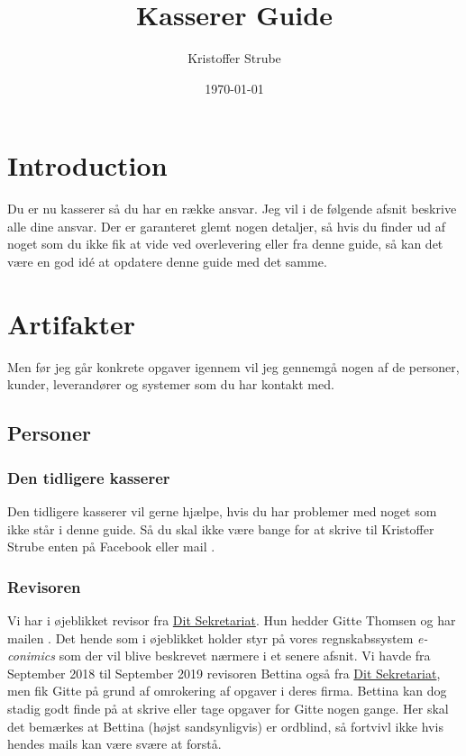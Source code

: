 

\title{Kasserer Guide}                        %
\date{\today}
\author{Kristoffer Strube}                       %



\maketitle

\tableofcontents

\clearpage

\section{Introduction}
Du er nu kasserer så du har en række ansvar. Jeg vil i de følgende afsnit beskrive alle dine ansvar. Der er garanteret glemt nogen detaljer, så hvis du finder ud af noget som du ikke fik at vide ved overlevering eller fra denne guide, så kan det være en god idé at opdatere denne guide med det samme.

\section{Artifakter}
Men før jeg går konkrete opgaver igennem vil jeg gennemgå nogen af de personer, kunder, leverandører og systemer som du har kontakt med.
\subsection{Personer}
\subsubsection{Den tidligere kasserer}
Den tidligere kasserer vil gerne hjælpe, hvis du har problemer med noget som ikke står i denne guide. Så du skal ikke være bange for at skrive til Kristoffer Strube enten på Facebook eller mail .
\subsubsection{Revisoren}
Vi har i øjeblikket revisor fra \href{https://www.sekr.dk/}{Dit Sekretariat}. Hun hedder Gitte Thomsen og har mailen . Det hende som i øjeblikket holder styr på vores regnskabssystem \textit{e-conimics} som der vil blive beskrevet nærmere i et senere afsnit. Vi havde fra September 2018 til September 2019 revisoren Bettina også fra \href{https://www.sekr.dk/}{Dit Sekretariat}, men fik Gitte på grund af omrokering af opgaver i deres firma. Bettina kan dog stadig godt finde på at skrive eller tage opgaver for Gitte nogen gange. Her skal det bemærkes at Bettina (højst sandsynligvis) er ordblind, så fortvivl ikke hvis hendes mails kan være svære at forstå.
